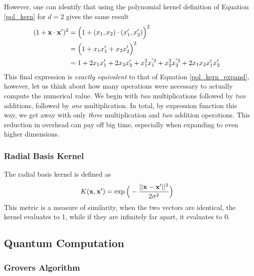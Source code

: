 However, one can identify that using the polynomial kernel definition of Equation \ref{pol_kern} for $d=2$ gives the same result
\begin{align}
	(1+ \textbf{x}\cdot \textbf{x}')^2 &= \Big(1+(x_1,x_2)\cdot(x_1',x_2')\Big)^2\\
	&= \Big(1+x_1x_1'+x_2x_2'\Big)^2\\
	&= 1 + 2x_1x_1' + 2x_2x_2' + x_1^2x_1^{'2}+x_2^2x_2^{'2} + 2x_1x_2x_1'x_2'
\end{align}
This final expression is \emph{exactly equivalent} to that of Equation \ref{pol_kern_expand}, however, let us think about how many operations were necessary to actually compute the numerical value. We begin with \emph{two} multiplications followed by \emph{two} additions, followed by \emph{one} multiplication. In total, by expression function this way, we get away with only \emph{three} multiplication and \emph{two} addition operations. This reduction in overhead can pay off big time, especially when expanding to even higher dimensions.

\subsubsection{Radial Basis Kernel}
The radial basis kernel is defined as 
\begin{align}
		K(\textbf{x},\textbf{x}') = \exp\Big(-\frac{||\textbf{x}-\textbf{x}'||^2}{2\sigma^2}\Big)
\end{align}
This metric is a measure of similarity, when the two vectors are identical, the kernel evaluates to 1, while if they are infinitely far apart, it evaluates to 0.



\subsection{Quantum Computation}
\subsubsection{Grovers Algorithm}
